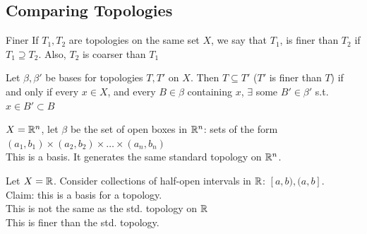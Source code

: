 \subsection{Comparing Topologies}
\begin{definition}{Finer}{}
    If $T_1,T_2$ are topologies on the same set $X$, we say that $T_1$, is finer than $T_2$ if $T_1 \supseteq T_2$. Also, $T_2$ is coarser than $T_1$
\end{definition}
\begin{proposition}{}{}
    Let $\beta,\beta'$ be bases for topologies $T,T'$ on $X$. Then $T \subseteq T'$ ($T'$ is finer than $T$) if and
    only if every $x \in X$, and every $B \in \beta$ containing $x$, $\exists$ some $B' \in \beta'$ s.t. $x \in B' \subset B$
\end{proposition}
\begin{example*}{}{}
    $X = \mathbb{R}^n$, let $\beta$ be the set of open boxes in $\mathbb{R}^n$: sets of the form $(a_1,b_1) \times (a_2,b_2) \times \dots \times (a_n,b_n)$\\
    This is a basis. It generates the same standard topology on $\mathbb{R}^n$.
\end{example*}
\begin{example*}{}{}
    Let $X = \mathbb{R}$. Consider collections of half-open intervals in $\mathbb{R}$: $[a,b),(a,b]$.\\
    Claim: this is a basis for a topology.\\
    This is not the same as the std. topology on $\mathbb{R}$\\
    This is finer than the std. topology.
\end{example*}